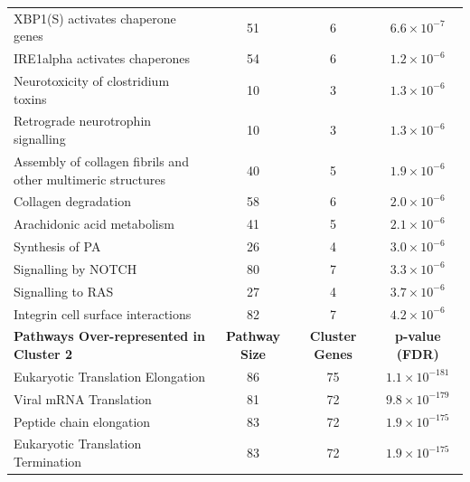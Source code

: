 \begin{table}[!hp]
{\begin{threeparttable}
\begin{tabular}{lccc}
  XBP1(S) activates chaperone genes &  51 &   6 & $6.6 \times 10^{-7}$ \\
  \rowcolor{Cluster_Blue!20} 
  IRE1alpha activates chaperones &  54 &   6 & $1.2 \times 10^{-6}$ \\
  \rowcolor{Cluster_Blue!15} 
  Neurotoxicity of clostridium toxins &  10 &   3 & $1.3 \times 10^{-6}$ \\
  \rowcolor{Cluster_Blue!20} 
  Retrograde neurotrophin signalling &  10 &   3 & $1.3 \times 10^{-6}$ \\
  \rowcolor{Cluster_Blue!15} 
  Assembly of collagen fibrils and other multimeric structures &  40 &   5 & $1.9 \times 10^{-6}$ \\
  \rowcolor{Cluster_Blue!20} 
  Collagen degradation &  58 &   6 & $2.0 \times 10^{-6}$ \\
  \rowcolor{Cluster_Blue!15} 
  Arachidonic acid metabolism &  41 &   5 & $2.1 \times 10^{-6}$ \\
  \rowcolor{Cluster_Blue!20} 
  Synthesis of PA &  26 &   4 & $3.0 \times 10^{-6}$ \\
  \rowcolor{Cluster_Blue!15} 
  Signalling by NOTCH &  80 &   7 & $3.3 \times 10^{-6}$ \\
  \rowcolor{Cluster_Blue!20} 
  Signalling to RAS &  27 &   4 & $3.7 \times 10^{-6}$ \\
  \rowcolor{Cluster_Blue!15} 
  Integrin cell surface interactions &  82 &   7 & $4.2 \times 10^{-6}$ \\
  \hline
  \cellcolor{white} \large{\textbf{Pathways Over-represented in Cluster 2}} & \large{\textbf{Pathway Size}} & \large{\textbf{Cluster Genes}} & \large{\textbf{p-value (\gls{FDR})}} \\ %
  \hline
  \rowcolor{Cluster_Green!20}
  Eukaryotic Translation Elongation &  86 &  75 & $1.1 \times 10^{-181}$ \\
  \rowcolor{Cluster_Green!15} 
  Viral \acrshort{mRNA} Translation &  81 &  72 & $9.8 \times 10^{-179}$ \\
  \rowcolor{Cluster_Green!20} 
  Peptide chain elongation &  83 &  72 & $1.9 \times 10^{-175}$ \\
  \rowcolor{Cluster_Green!15} 
  Eukaryotic Translation Termination &  83 &  72 & $1.9 \times 10^{-175}$ \\

\end{tabular}
\end{threeparttable}}
\end{table}
